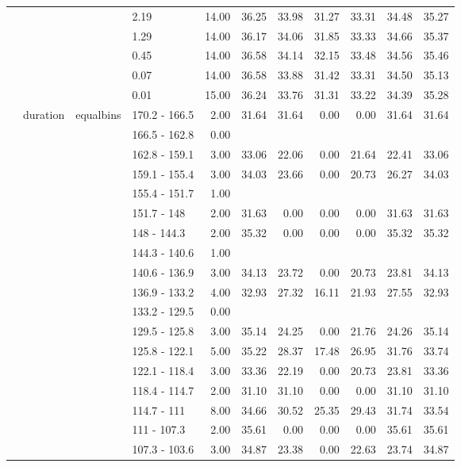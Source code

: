 \begin{longtable}{llllrrrrrrr}
   &  &  & 2.19 & 14.00 & 36.25 & 33.98 & 31.27 & 33.31 & 34.48 & 35.27 \\ 
   &  &  & 1.29 & 14.00 & 36.17 & 34.06 & 31.85 & 33.33 & 34.66 & 35.37 \\ 
   &  &  & 0.45 & 14.00 & 36.58 & 34.14 & 32.15 & 33.48 & 34.56 & 35.46 \\ 
   &  &  & 0.07 & 14.00 & 36.58 & 33.88 & 31.42 & 33.31 & 34.50 & 35.13 \\ 
   &  &  & 0.01 & 15.00 & 36.24 & 33.76 & 31.31 & 33.22 & 34.39 & 35.28 \\ 
   & duration & equalbins & 170.2 - 166.5 & 2.00 & 31.64 & 31.64 & 0.00 & 0.00 & 31.64 & 31.64 \\ 
   &  &  & 166.5 - 162.8 & 0.00 &  &  &  &  &  &  \\ 
   &  &  & 162.8 - 159.1 & 3.00 & 33.06 & 22.06 & 0.00 & 21.64 & 22.41 & 33.06 \\ 
   &  &  & 159.1 - 155.4 & 3.00 & 34.03 & 23.66 & 0.00 & 20.73 & 26.27 & 34.03 \\ 
   &  &  & 155.4 - 151.7 & 1.00 &  &  &  &  &  &  \\ 
   &  &  & 151.7 - 148 & 2.00 & 31.63 & 0.00 & 0.00 & 0.00 & 31.63 & 31.63 \\ 
   &  &  & 148 - 144.3 & 2.00 & 35.32 & 0.00 & 0.00 & 0.00 & 35.32 & 35.32 \\ 
   &  &  & 144.3 - 140.6 & 1.00 &  &  &  &  &  &  \\ 
   &  &  & 140.6 - 136.9 & 3.00 & 34.13 & 23.72 & 0.00 & 20.73 & 23.81 & 34.13 \\ 
   &  &  & 136.9 - 133.2 & 4.00 & 32.93 & 27.32 & 16.11 & 21.93 & 27.55 & 32.93 \\ 
   &  &  & 133.2 - 129.5 & 0.00 &  &  &  &  &  &  \\ 
   &  &  & 129.5 - 125.8 & 3.00 & 35.14 & 24.25 & 0.00 & 21.76 & 24.26 & 35.14 \\ 
   &  &  & 125.8 - 122.1 & 5.00 & 35.22 & 28.37 & 17.48 & 26.95 & 31.76 & 33.74 \\ 
   &  &  & 122.1 - 118.4 & 3.00 & 33.36 & 22.19 & 0.00 & 20.73 & 23.81 & 33.36 \\ 
   &  &  & 118.4 - 114.7 & 2.00 & 31.10 & 31.10 & 0.00 & 0.00 & 31.10 & 31.10 \\ 
   &  &  & 114.7 - 111 & 8.00 & 34.66 & 30.52 & 25.35 & 29.43 & 31.74 & 33.54 \\ 
   &  &  & 111 - 107.3 & 2.00 & 35.61 & 0.00 & 0.00 & 0.00 & 35.61 & 35.61 \\ 
   &  &  & 107.3 - 103.6 & 3.00 & 34.87 & 23.38 & 0.00 & 22.63 & 23.74 & 34.87 \\ 

\end{longtable}
